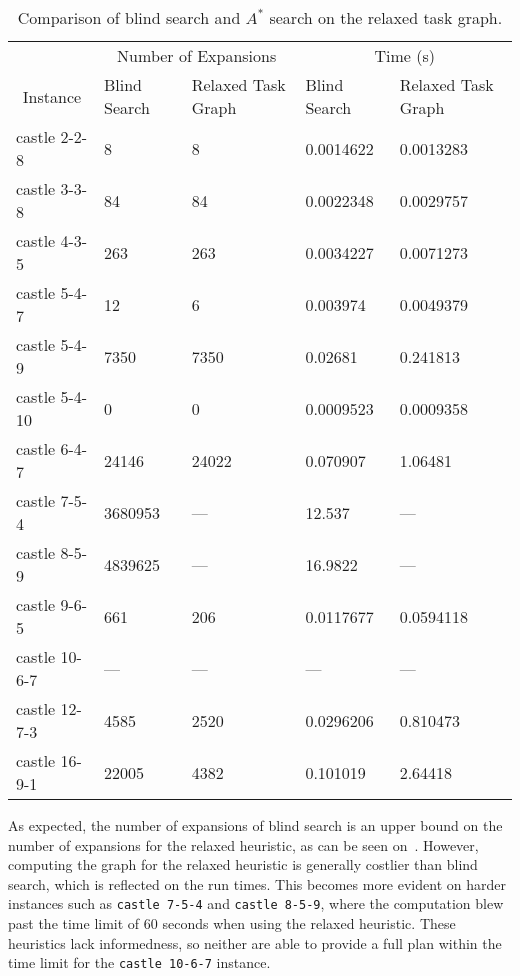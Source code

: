 \documentclass[11pt]{article}
\begin{document}
\begin{titlepage}
\begin{table}
    \begin{tabular}{|l|l|l|l|l|}
    \hline
    \multicolumn{1}{|c|}{} & \multicolumn{2}{c|}{Number of Expansions} & \multicolumn{2}{c|}{Time (s)}\\
    \cline{2-5}
    \multicolumn{1}{|c|}{Instance} & Blind Search & Relaxed Task Graph & Blind Search & Relaxed Task Graph \\
    \hline
    castle 2-2-8 & 8 & 8 & 0.0014622 & 0.0013283 \\
    \hline
    castle 3-3-8 & 84 & 84 & 0.0022348 & 0.0029757 \\
    \hline
    castle 4-3-5 & 263 & 263 & 0.0034227 & 0.0071273 \\
    \hline
    castle 5-4-7 & 12 & 6 & 0.003974 & 0.0049379 \\
    \hline
    castle 5-4-9 & 7350 & 7350 & 0.02681 & 0.241813 \\
    \hline
    castle 5-4-10 & 0 & 0 & 0.0009523 & 0.0009358 \\
    \hline
    castle 6-4-7 & 24146 & 24022 & 0.070907 & 1.06481 \\
    \hline
    castle 7-5-4 & 3680953 & — & 12.537 & — \\
    \hline
    castle 8-5-9 & 4839625 & — & 16.9822 & — \\
    \hline
    castle 9-6-5 & 661 & 206 & 0.0117677 & 0.0594118 \\
    \hline
    castle 10-6-7 & — & — & — & — \\
    \hline
    castle 12-7-3 & 4585 & 2520 & 0.0296206 & 0.810473 \\
    \hline
    castle 16-9-1 & 22005 & 4382 & 0.101019 & 2.64418 \\
    \hline
    \end{tabular}
    \caption{Comparison of blind search and $A^*$ search on the relaxed task graph.}
    \label{tab:rtg-blind}
\end{table}

As expected, the number of expansions of blind search is an upper bound on the number of expansions for the relaxed heuristic, as can be seen on~.
However, computing the graph for the relaxed heuristic is generally costlier than blind search,
which is reflected on the run times.
This becomes more evident on harder instances such as \texttt{castle 7-5-4} and \texttt{castle 8-5-9},
where the computation blew past the time limit of 60 seconds when using the relaxed heuristic.
These heuristics lack informedness, so neither are able to provide a full plan within the time limit
for the \texttt{castle 10-6-7} instance. \par


\end{titlepage}
\end{document}
